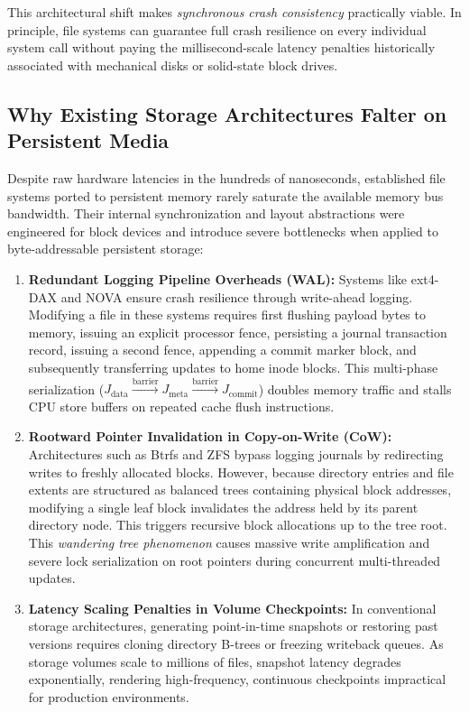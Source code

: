\documentclass[conference]{IEEEtran}
\begin{document}
This architectural shift makes \textit{synchronous crash consistency} practically viable. In principle, file systems can guarantee full crash resilience on every individual system call without paying the millisecond-scale latency penalties historically associated with mechanical disks or solid-state block drives.

\subsection{Why Existing Storage Architectures Falter on Persistent Media}
Despite raw hardware latencies in the hundreds of nanoseconds, established file systems ported to persistent memory rarely saturate the available memory bus bandwidth. Their internal synchronization and layout abstractions were engineered for block devices and introduce severe bottlenecks when applied to byte-addressable persistent storage:
\begin{enumerate}
    \item \textbf{Redundant Logging Pipeline Overheads (WAL):} Systems like ext4-DAX and NOVA \cite{nova} ensure crash resilience through write-ahead logging. Modifying a file in these systems requires first flushing payload bytes to memory, issuing an explicit processor fence, persisting a journal transaction record, issuing a second fence, appending a commit marker block, and subsequently transferring updates to home inode blocks. This multi-phase serialization ($J_{\text{data}} \xrightarrow{\text{barrier}} J_{\text{meta}} \xrightarrow{\text{barrier}} J_{\text{commit}}$) doubles memory traffic and stalls CPU store buffers on repeated cache flush instructions.
    \item \textbf{Rootward Pointer Invalidation in Copy-on-Write (CoW):} Architectures such as Btrfs \cite{btrfs} and ZFS \cite{zfs} bypass logging journals by redirecting writes to freshly allocated blocks. However, because directory entries and file extents are structured as balanced trees containing physical block addresses, modifying a single leaf block invalidates the address held by its parent directory node. This triggers recursive block allocations up to the tree root. This \textit{wandering tree phenomenon} causes massive write amplification and severe lock serialization on root pointers during concurrent multi-threaded updates.
    \item \textbf{Latency Scaling Penalties in Volume Checkpoints:} In conventional storage architectures, generating point-in-time snapshots or restoring past versions requires cloning directory B-trees or freezing writeback queues. As storage volumes scale to millions of files, snapshot latency degrades exponentially, rendering high-frequency, continuous checkpoints impractical for production environments.
\end{enumerate}
\end{document}
